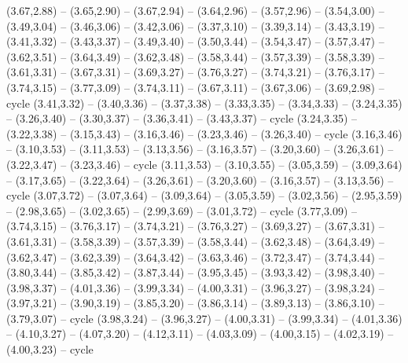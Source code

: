 \expandafter\def\csname geo:gebiet:COL\endcsname{
  (3.67,2.88) -- (3.65,2.90) -- (3.67,2.94) -- (3.64,2.96) -- (3.57,2.96) -- (3.54,3.00) -- (3.49,3.04) -- (3.46,3.06) -- (3.42,3.06) -- (3.37,3.10) -- (3.39,3.14) -- (3.43,3.19) -- (3.41,3.32) -- (3.43,3.37) -- (3.49,3.40) -- (3.50,3.44) -- (3.54,3.47) -- (3.57,3.47) -- (3.62,3.51) -- (3.64,3.49) -- (3.62,3.48) -- (3.58,3.44) -- (3.57,3.39) -- (3.58,3.39) -- (3.61,3.31) -- (3.67,3.31) -- (3.69,3.27) -- (3.76,3.27) -- (3.74,3.21) -- (3.76,3.17) -- (3.74,3.15) -- (3.77,3.09) -- (3.74,3.11) -- (3.67,3.11) -- (3.67,3.06) -- (3.69,2.98) -- cycle}
\expandafter\def\csname geo:gebiet:PAN\endcsname{
  (3.41,3.32) -- (3.40,3.36) -- (3.37,3.38) -- (3.33,3.35) -- (3.34,3.33) -- (3.24,3.35) -- (3.26,3.40) -- (3.30,3.37) -- (3.36,3.41) -- (3.43,3.37) -- cycle}
\expandafter\def\csname geo:gebiet:CRI\endcsname{
  (3.24,3.35) -- (3.22,3.38) -- (3.15,3.43) -- (3.16,3.46) -- (3.23,3.46) -- (3.26,3.40) -- cycle}
\expandafter\def\csname geo:gebiet:NIC\endcsname{
  (3.16,3.46) -- (3.10,3.53) -- (3.11,3.53) -- (3.13,3.56) -- (3.16,3.57) -- (3.20,3.60) -- (3.26,3.61) -- (3.22,3.47) -- (3.23,3.46) -- cycle}
\expandafter\def\csname geo:gebiet:HND\endcsname{
  (3.11,3.53) -- (3.10,3.55) -- (3.05,3.59) -- (3.09,3.64) -- (3.17,3.65) -- (3.22,3.64) -- (3.26,3.61) -- (3.20,3.60) -- (3.16,3.57) -- (3.13,3.56) -- cycle}
\expandafter\def\csname geo:gebiet:SLV\endcsname{
  }
\expandafter\def\csname geo:gebiet:GTM\endcsname{
  (3.07,3.72) -- (3.07,3.64) -- (3.09,3.64) -- (3.05,3.59) -- (3.02,3.56) -- (2.95,3.59) -- (2.98,3.65) -- (3.02,3.65) -- (2.99,3.69) -- (3.01,3.72) -- cycle}
\expandafter\def\csname geo:gebiet:BLZ\endcsname{
  }
\expandafter\def\csname geo:gebiet:VEN\endcsname{
  (3.77,3.09) -- (3.74,3.15) -- (3.76,3.17) -- (3.74,3.21) -- (3.76,3.27) -- (3.69,3.27) -- (3.67,3.31) -- (3.61,3.31) -- (3.58,3.39) -- (3.57,3.39) -- (3.58,3.44) -- (3.62,3.48) -- (3.64,3.49) -- (3.62,3.47) -- (3.62,3.39) -- (3.64,3.42) -- (3.63,3.46) -- (3.72,3.47) -- (3.74,3.44) -- (3.80,3.44) -- (3.85,3.42) -- (3.87,3.44) -- (3.95,3.45) -- (3.93,3.42) -- (3.98,3.40) -- (3.98,3.37) -- (4.01,3.36) -- (3.99,3.34) -- (4.00,3.31) -- (3.96,3.27) -- (3.98,3.24) -- (3.97,3.21) -- (3.90,3.19) -- (3.85,3.20) -- (3.86,3.14) -- (3.89,3.13) -- (3.86,3.10) -- (3.79,3.07) -- cycle}
\expandafter\def\csname geo:gebiet:GUY\endcsname{
  (3.98,3.24) -- (3.96,3.27) -- (4.00,3.31) -- (3.99,3.34) -- (4.01,3.36) -- (4.10,3.27) -- (4.07,3.20) -- (4.12,3.11) -- (4.03,3.09) -- (4.00,3.15) -- (4.02,3.19) -- (4.00,3.23) -- cycle}
